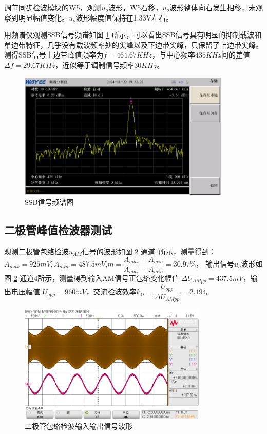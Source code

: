 \documentclass[UTF8]{ctexart}
\begin{document}
调节同步检波模块的W5，观测$u_o$波形，W5右移，$u_o$波形整体向右发生相移，未观察到明显幅值变化。$u_o$波形幅度值保持在1.33V左右。

用频谱仪观测SSB信号频谱如图 \ref{fig:33} 所示，可以看出SSB信号具有明显的抑制载波和单边带特征，几乎没有载波频率处的尖峰以及下边带尖峰，只保留了上边带尖峰。测得SSB信号上边带峰值频率为$f=464.67KHz$，与中心频率$435KHz$间的差值$\Delta f=29.67KHz$，近似等于调制信号频率$30KHz$。
\begin{figure}[H]
    \centering
    \includegraphics[width=0.9\textwidth]{pics/33.png}
    \caption{SSB信号频谱图}\label{fig:33}
\end{figure}

\subsection{二极管峰值检波器测试}
观测二极管包络检波$u_{AM}$信号的波形如图 \ref{fig:41} 通道1所示，测量得到：$A_{max}=925mV,A_{min}=487.5mV$,$m=\dfrac{A_{max}-A_{min}}{A_{max}+A_{min}}=30.97\%$，
输出信号$u_o$波形如图 \ref{fig:41} 通道4所示，测量得到输入AM信号正包络变化幅值 $\Delta U_{AMpp}=437.5mV$，输出电压幅值 $U_{opp}=960mV$，交流检波效率$k_\Omega=\dfrac{U_{opp}}{\Delta U_{AMpp}}=2.194$。
\begin{figure}[H]
    \centering
    \includegraphics[width=0.8\textwidth]{pics/41.png}
    \caption{二极管包络检波输入输出信号波形}\label{fig:41}
\end{figure}
\end{document}
